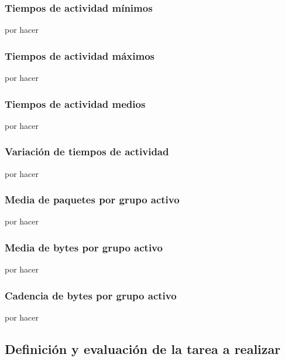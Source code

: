 \subsubsection{Tiempos de actividad mínimos}

por hacer

\subsubsection{Tiempos de actividad máximos}

por hacer

\subsubsection{Tiempos de actividad medios}

por hacer

\subsubsection{Variación de tiempos de actividad}

por hacer

\subsubsection{Media de paquetes por grupo activo}

por hacer

\subsubsection{Media de bytes por grupo activo}

por hacer

\subsubsection{Cadencia de bytes por grupo activo}

por hacer

\subsection{Definición y evaluación de la tarea a realizar}

